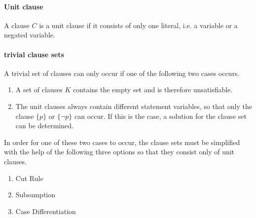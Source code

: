 \paragraph{Unit clause}
A clause $C$ is a unit clause if it consists of only one literal, i.e. a variable or a negated variable.

\paragraph{trivial clause sets}
A trivial set of clauses can only occur if one of the following two cases occurs.

\begin{enumerate}
  \item A set of clauses $K$ contains the empty set and is therefore unsatisfiable.
  \item The unit clauses always contain different statement variables, so that only the clause $\{p\}$ or $\{\neg p\}$ can occur. If this is the case, a solution for the clause set can be determined.
\end{enumerate}

In order for one of these two cases to occur, the clause sets must be simplified with the help of the following three options so that they consist only of unit clauses.

\begin{enumerate}
  \item Cut Rule 
  \item Subsumption
  \item Case Differentiation
\end{enumerate}

